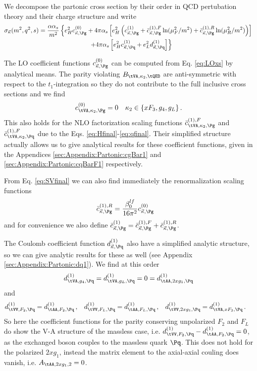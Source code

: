 We decompose the partonic cross section by their order in QCD pertubation theory and their charge structure and write
\begin{align}
\sigma_{\vec \kappa}(m^2,q^2,s) &= \frac{\alpha\alpha_s}{m^2}\left\{e_H^2 c_{\vec\kappa,\Pg}^{(0)} + 4\pi\alpha_s\left[e_H^2\left(c_{\vec\kappa,\Pg}^{(1)} + \bar c_{\vec\kappa,\Pg}^{(1),F}\ln(\mu_F^2/m^2)  + \bar c_{\vec\kappa,\Pg}^{(1),R}\ln(\mu_R^2/m^2) \right) \right] \right.\nonumber\\
 &\hspace{80pt} \left. + 4\pi\alpha_s\left[e_H^2 c_{\vec \kappa,\Pq}^{(1)} + e_L^2 d_{\vec \kappa,\Pq}^{(1)}\right]\right\}
\end{align}

The LO coefficient functions $c_{\vec\kappa,\Pg}^{(0)}$ can be computed from Eq. \ref{eq:LOxs} by analytical means. The parity violating $B_{\tVA,\kappa_2,\tQED}$ are anti-symmetric with respect to the $t_1$-integration so they do not contribute to the full inclusive cross sections and we find
\begin{equation}
c_{\tVA,\kappa_2,\Pg}^{(0)} = 0 \quad \kappa_2\in\{xF_3,g_4,g_L\}\,.
\end{equation}
This also holds for the NLO factorization scaling functions $\bar c_{\tVA,\kappa_2,\Pg}^{(1),F}$ and $\bar c_{\tVA,\kappa_2,\Pq}^{(1),F}$ due to the Eqs. \ref{eq:Hfinal}-\ref{eq:qfinal}. Their simplified structure actually allows us to give analytical results for these coefficient functions, given in the Appendices \ref{sec:Appendix:Partonic:cgBar1} and \ref{sec:Appendix:Partonic:cqBarF1} respectively.

From Eq. \ref{eq:SVfinal} we can also find immediately the renormalization scaling functions
\begin{align}
\bar c_{\vec\kappa,\Pg}^{(1),R} &= \frac{\beta_0^{lf}}{16\pi^2} c_{\vec\kappa,\Pg}^{(0)}
\end{align}
and for convenience we also define $\bar c_{\vec\kappa,\Pg}^{(1)} = \bar c_{\vec\kappa,\Pg}^{(1),F} + \bar c_{\vec\kappa,\Pg}^{(1),R}$.

The Coulomb coefficient function $d_{\vec\kappa,\Pq}^{(1)}$ also have a simplified analytic structure, so we can give analytic results for these as well (see Appendix \ref{sec:Appendix:Partonic:dq1}). We find at this order
\begin{equation}
d_{\tVA,g_4,\Pq}^{(1)} = d_{\tVA,g_L,\Pq}^{(1)} = 0 = d_{\tAA,2xg_1,\Pq}^{(1)}
\end{equation}
and
\begin{align}
d_{\tVV,F_2,\Pq}^{(1)} &= d_{\tAA,F_2,\Pq}^{(1)}\,,
&d_{\tVV,F_L,\Pq}^{(1)} &= d_{\tAA,F_L,\Pq}^{(1)}\,,
&d_{\tVV,2xg_1,\Pq}^{(1)} &= d_{\tVA,xF_3,\Pq}^{(1)}\,. 
\end{align}
So here the coefficient functions for the parity conserving unpolarized $F_2$ and $F_L$ do show the V-A structure of the massless case, i.e. $d_{\tVV,F_2,\Pq}^{(1)} - d_{\tAA,F_2,\Pq}^{(1)} = 0$, as the exchanged boson couples to the massless quark $\Pq$. This does not hold for the polarized $2xg_1$, instead the matrix element to the axial-axial couling does vanish, i.e. $A_{\tAA,2xg_1,2} = 0$.
